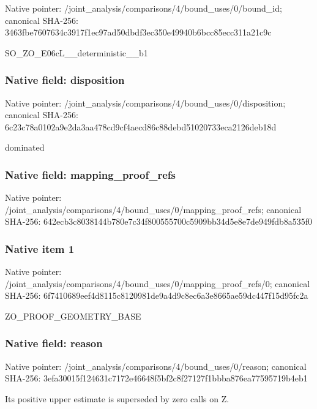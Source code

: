 \documentclass[10pt,a4paper]{article}
\begin{document}
Native pointer: /joint\_analysis/comparis\allowbreak{}ons/4/bound\_uses/0/bound\allowbreak{}\_id; canonical SHA-256: 3463fbe7607634c3917f1ec9\allowbreak{}7ad50dbdf3ec350e49940b6b\allowbreak{}cc85ecc311a21c9c


SO\_ZO\_E06cL\_\_deterministic\_\_b1


\subsubsection{Native field: disposition}


Native pointer: /joint\_analysis/comparis\allowbreak{}ons/4/bound\_uses/0/dispo\allowbreak{}sition; canonical SHA-256: 6c23c78a0102a9e2da3aa478\allowbreak{}cd9cf4aecd86c88debd51020\allowbreak{}733eca2126deb18d


dominated


\subsubsection{Native field: mapping\_proof\_refs}


Native pointer: /joint\_analysis/comparis\allowbreak{}ons/4/bound\_uses/0/mappi\allowbreak{}ng\_proof\_refs; canonical SHA-256: 642ecb3c8038144b780e7c34\allowbreak{}f800555700c5909bb34d5e8e\allowbreak{}7de949fdb8a535f0



\subsubsection{Native item 1}


Native pointer: /joint\_analysis/comparis\allowbreak{}ons/4/bound\_uses/0/mappi\allowbreak{}ng\_proof\_refs/0; canonical SHA-256: 6f7410689eef4d8115c81209\allowbreak{}81de9a4d9c8ec6a3e8665ae5\allowbreak{}9dc447f15d95fc2a


ZO\_PROOF\_GEOMETRY\_BASE


\subsubsection{Native field: reason}


Native pointer: /joint\_analysis/comparis\allowbreak{}ons/4/bound\_uses/0/reaso\allowbreak{}n; canonical SHA-256: 3efa30015f124631c7172e46\allowbreak{}648f5bf2c8f27127f1bbba87\allowbreak{}6ea77595719b4eb1


Its positive upper estimate is superseded by zero calls on Z.
\end{document}
